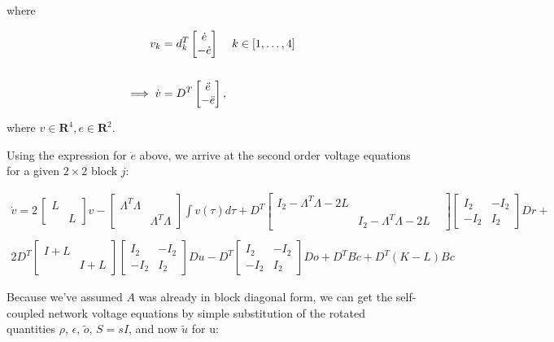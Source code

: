 \begin{itemize}
where

\begin{align*}
v_k &= d_k^T \begin{bmatrix}
\dot{e}
\\
-\dot{e}
\end{bmatrix}  \hspace{4mm} k \in [1, \ldots, 4]
\\
\\
\implies
\dot{v} &=
D^T \begin{bmatrix}
\ddot{e}
\\
-\ddot{e}
\end{bmatrix},
\end{align*}

where $v \in \mathbf{R}^{4}, e \in \mathbf{R}^2$.

Using the expression for $\ddot{e}$ above, we arrive at the second order voltage equations for a given $2 \times 2 $ block $j$:

\begin{align*}
\dot{v} = 2\, \begin{bmatrix}
L & 
\\
& L
\end{bmatrix}
v
-
\begin{bmatrix}
\Lambda^T \Lambda &
\\
&\Lambda^T \Lambda
\end{bmatrix}
\int v(\tau) d\tau 
+
D^T 
\begin{bmatrix}
I_2 - \Lambda^T \Lambda - 2L &
\\
& I_2 - \Lambda^T \Lambda - 2L &
\end{bmatrix}
\begin{bmatrix}
I_2& -I_2
\\
-I_2 & I_2
\end{bmatrix}
D r
+ 
\\
\\
2 D^T
\begin{bmatrix}
I + L &
\\
&I + L
\end{bmatrix}
\begin{bmatrix}
I_2& -I_2
\\
-I_2& I_2
\end{bmatrix}
D u
-
D^T
\begin{bmatrix}
I_2& -I_2
\\
-I_2& I_2
\end{bmatrix}
D o
+ D^T B\dot{c} 
+ D^T(K - L)Bc
\end{align*}


Because we've assumed $A$ was already in block diagonal form, we can get the self-coupled network voltage equations by simple substitution of the rotated quantities $\rho$, $\epsilon$,  $\tilde{o}$, $S = sI$, and now  $\tilde{u}$ for u:


\end{itemize}
